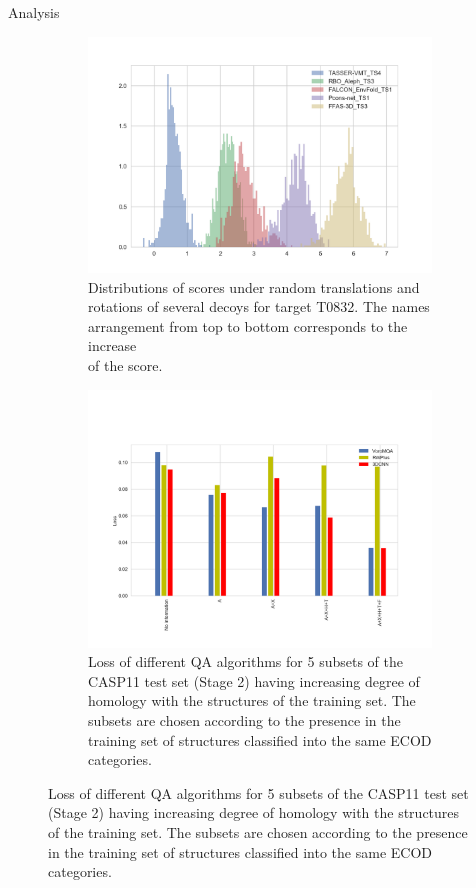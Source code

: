 \documentclass[final, unknownkeysallowed]{beamer}
\makeatletter
\newcommand\nocaption{%
    \renewcommand\p@subfigure{}
    \renewcommand\thesubfigure{\thefigure\alph{subfigure}}
}
\makeatother
\begin{document}
\begin{frame}{}
\begin{textblock}{39.0}
\begin{block}{Analysis}
\begin{figure}[H]
\nocaption
    \centering
    \begin{subfigure}[t]{.5\textwidth}
    \includegraphics[trim=50 0 0 70,clip,width=\linewidth]{../draft/Fig/decoys_sampling_dist.png}
    \captionsetup{width=\linewidth}
    \caption{Distributions of scores under random translations and
      \\ rotations of several decoys for target T0832. The names
      arrangement from top to bottom corresponds to the increase \\ of
      the score.}
    \label{Fig:DecoysScoreDistribution}
    \end{subfigure}%
    \begin{subfigure}[t]{.5\textwidth}
    \includegraphics[trim=50 20 50 110,clip,width=\linewidth]{../draft/Fig/LossVsECOD.png}
    \captionsetup{width=\linewidth}
    \caption{Loss of different QA algorithms for 5 subsets of the
      CASP11 test set (Stage 2) having increasing degree of homology
      with the structures of the training set. The subsets are chosen
      according to the presence in the training set of structures
      classified into the same ECOD categories.}
    \label{Fig:LossVsECOD}
    \end{subfigure}
\end{figure}


\end{block}
\end{textblock}
\end{frame}
\end{document}
